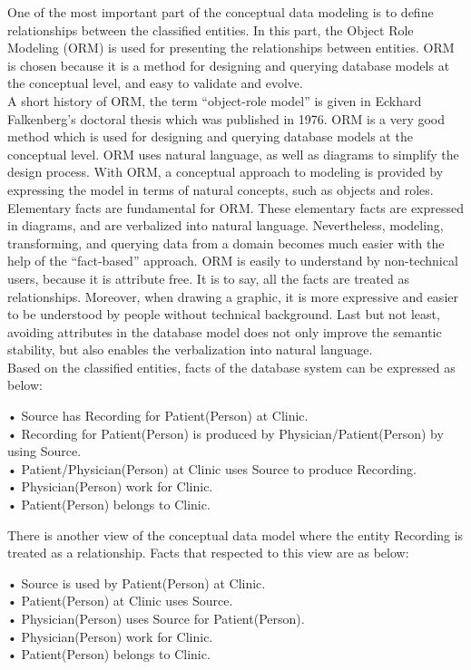 One of the most important part of the conceptual data modeling is to define relationships between the classified entities. In this part, the Object Role Modeling (ORM) is used for presenting the relationships between entities. ORM is chosen because it is a method for designing and querying database models at the conceptual level, and easy to validate and evolve\cite{ORMdotNET}.\\
A short history of ORM, the term “object-role model” is given in Eckhard Falkenberg’s doctoral thesis which was published in 1976\cite{Wiki_ORM}. ORM is a very good method which is used for designing and querying database models at the conceptual level. ORM uses natural language, as well as diagrams to simplify the design process. With ORM, a conceptual approach to modeling is provided by expressing the model in terms of natural concepts, such as objects and roles. Elementary facts are fundamental for ORM. These elementary facts are expressed in diagrams, and are verbalized into natural language. Nevertheless, modeling, transforming, and querying data from a domain becomes much easier with the help of the “fact-based” approach. ORM is easily to understand by non-technical users, because it is attribute free. It is to say, all the facts are treated as relationships. Moreover, when drawing a graphic, it is more expressive and easier to be understood by people without technical background. Last but not least, avoiding attributes in the database model does not only improve the semantic stability, but also enables the verbalization into natural language.\\
Based on the classified entities, facts of the database system can be expressed as below:
\begin{adjustwidth}{1cm}{}
•	Source has Recording for Patient(Person) at Clinic.\\
•	Recording for Patient(Person) is produced by Physician/Patient(Person) by using Source.\\
•	Patient/Physician(Person) at Clinic uses Source to produce Recording.\\
•	Physician(Person) work for Clinic.\\
•	Patient(Person) belongs to Clinic.
\end{adjustwidth}
There is another view of the conceptual data model where the entity Recording is treated as a relationship. Facts that respected to this view are as below:
\begin{adjustwidth}{1cm}{}
•	Source is used by Patient(Person) at Clinic.\\
•	Patient(Person) at Clinic uses Source.\\
•	Physician(Person) uses Source for Patient(Person).\\
•	Physician(Person) work for Clinic.\\
•	Patient(Person) belongs to Clinic.
\end{adjustwidth}
